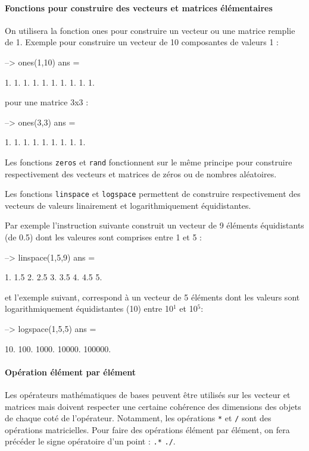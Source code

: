 \paragraph{Fonctions pour construire des vecteurs et matrices élémentaires}
On utilisera la fonction ones pour construire un vecteur ou une matrice remplie 
de 1.
Exemple pour construire un vecteur de 10 composantes de valeurs 1 :
\begin{Scilabcode}
--> ones(1,10)
 ans  =

    1.   1.   1.   1.   1.   1.   1.   1.   1.   1.

\end{Scilabcode}
pour une matrice 3x3 :
\begin{Scilabcode}
--> ones(3,3)
 ans  =

    1.   1.   1.
    1.   1.   1.
    1.   1.   1.
\end{Scilabcode}
Les fonctions \verb?zeros? et \verb?rand? fonctionnent sur le même principe 
pour construire respectivement des vecteurs et matrices de zéros ou de nombres 
aléatoires.

Les fonctions \verb?linspace? et \verb?logspace? permettent de construire 
respectivement des vecteurs de valeurs linairement et logarithmiquement 
équidistantes.  

Par exemple l'instruction suivante construit un vecteur de 9 éléments 
équidistants (de 0.5) dont les valeures sont comprises entre 1 et 5 :
\begin{Scilabcode}
--> linspace(1,5,9)
 ans  =

    1.   1.5   2.   2.5   3.   3.5   4.   4.5   5.
\end{Scilabcode}
et l'exemple suivant, correspond à un vecteur de 5 éléments dont les 
valeurs sont logarithmiquement équidistantes (10) entre 10$^1$ et 10$^5$:
\begin{Scilabcode}
--> logspace(1,5,5)
 ans  =

    10.   100.   1000.   10000.   100000.

\end{Scilabcode}
\paragraph{Opération élément par élément}
Les opérateurs mathématiques de bases peuvent être utilisés 
sur les vecteur et matrices mais doivent respecter une certaine 
cohérence des dimensions des objets de chaque coté de l'opérateur. 
Notamment, les opérations \verb?*? et \verb?/? sont des opérations 
matricielles. Pour faire des opérations élément par élément,
on fera précéder le signe opératoire d'un point : \verb?.*? \verb?./?.

